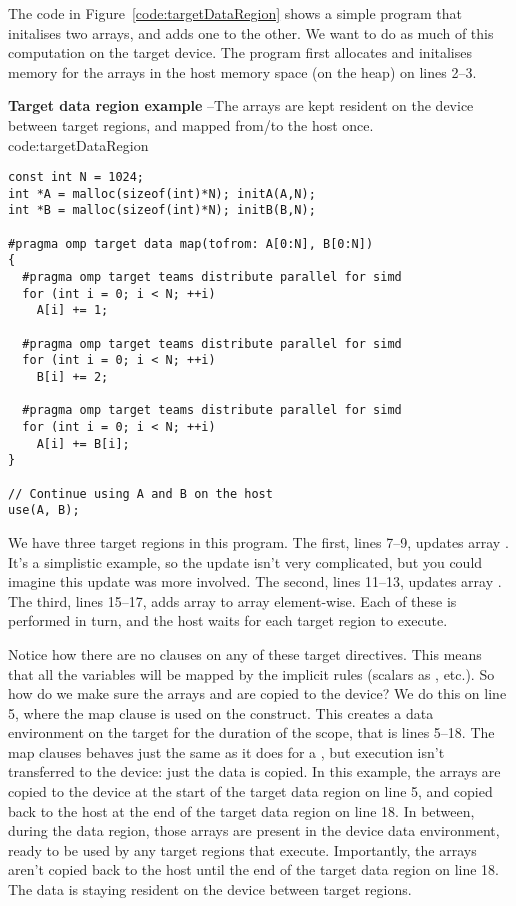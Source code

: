 The code in Figure~\ref{code:targetDataRegion} shows a simple program that initalises two arrays, and adds one to the other.
We want to do as much of this computation on the target device.
The program first allocates and initalises memory for the arrays in the host memory space (on the heap) on lines 2--3.

\begin{CodeExample}%
{\textbf{Target data region example} --\small The arrays are kept resident on the device between target regions, and mapped from/to the host once.
}%
{code:targetDataRegion}
\begin{lstlisting}
const int N = 1024;
int *A = malloc(sizeof(int)*N); initA(A,N);
int *B = malloc(sizeof(int)*N); initB(B,N);

#pragma omp target data map(tofrom: A[0:N], B[0:N])
{
  #pragma omp target teams distribute parallel for simd
  for (int i = 0; i < N; ++i)
    A[i] += 1;

  #pragma omp target teams distribute parallel for simd
  for (int i = 0; i < N; ++i)
    B[i] += 2;

  #pragma omp target teams distribute parallel for simd
  for (int i = 0; i < N; ++i)
    A[i] += B[i];
}

// Continue using A and B on the host
use(A, B);
\end{lstlisting}
\end{CodeExample}

We have three target regions in this program.
The first, lines 7--9, updates array .
It's a simplistic example, so the update isn't very complicated, but you could imagine this update was more involved.
The second, lines 11--13, updates array .
The third, lines 15--17, adds array  to array  element-wise.
Each of these is performed in turn, and the host waits for each target region to execute.

Notice how there are no  clauses on any of these target directives.
This means that all the variables will be mapped by the implicit rules (scalars as , etc.).
So how do we make sure the arrays  and  are copied to the device?
We do this on line 5, where the map clause is used on the  construct.
This creates a data environment on the target for the duration of the scope, that is lines 5--18.
The map clauses behaves just the same as it does for a , but execution isn't transferred to the device: just the data is copied.
In this example, the arrays are copied to the device at the start of the target data region on line 5, and copied back to the host at the end of the target data region on line 18.
In between, during the data region, those arrays are present in the device data environment, ready to be used by any target regions that execute.
Importantly, the arrays aren't copied back to the host until the end of the target data region on line 18.
The data is staying resident on the device between target regions.

